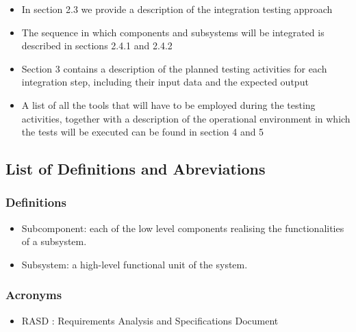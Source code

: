 \documentclass{article}
\begin{document}
\begin{flushleft}
\begin{itemize}
    \item  In section 2.3 we provide a description of the integration testing approach
     \item The sequence in which components and subsystems will be integrated is described in sections 2.4.1 and 2.4.2
      \item  Section 3 contains a description of the planned testing activities for each integration step, including their input data and the expected output
       \item  A list of all the tools that will have to be employed during the testing activities, together with a description of the operational environment in which the tests will be executed can be found in section 4 and 5
       
  \end{itemize}
  
  
  \subsection{List of Definitions and Abreviations }		%
  \subsubsection{Definitions}
  \begin{itemize}
  \item Subcomponent: each of the low level components realising the functionalities of a subsystem.
  \item Subsystem: a high-level functional unit of the system.
  \end{itemize}
  
  \subsubsection{Acronyms}
    \begin{itemize}
  \item RASD : Requirements Analysis and Specifications Document
  

\end{itemize}
\end{flushleft}
\end{document}
